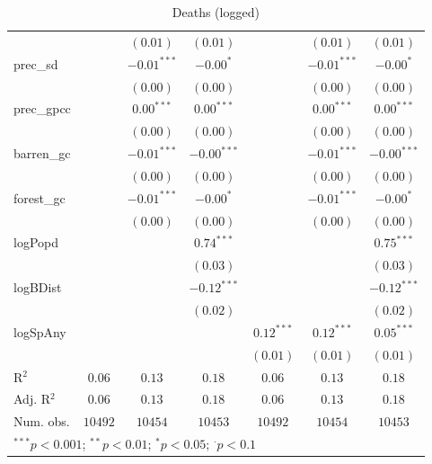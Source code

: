 \begin{sidewaystable}
\begin{center}
{\begin{tabular}{l c c c c c c}
                &               & $(0.01)$        & $(0.01)$      &               & $(0.01)$      & $(0.01)$      \\
prec\_sd        &               & $-0.01^{***}$   & $-0.00^{*}$   &               & $-0.01^{***}$ & $-0.00^{*}$   \\
                &               & $(0.00)$        & $(0.00)$      &               & $(0.00)$      & $(0.00)$      \\
prec\_gpcc      &               & $0.00^{***}$    & $0.00^{***}$  &               & $0.00^{***}$  & $0.00^{***}$  \\
                &               & $(0.00)$        & $(0.00)$      &               & $(0.00)$      & $(0.00)$      \\
barren\_gc      &               & $-0.01^{***}$   & $-0.00^{***}$ &               & $-0.01^{***}$ & $-0.00^{***}$ \\
                &               & $(0.00)$        & $(0.00)$      &               & $(0.00)$      & $(0.00)$      \\
forest\_gc      &               & $-0.01^{***}$   & $-0.00^{*}$   &               & $-0.01^{***}$ & $-0.00^{*}$   \\
                &               & $(0.00)$        & $(0.00)$      &               & $(0.00)$      & $(0.00)$      \\
logPopd         &               &                 & $0.74^{***}$  &               &               & $0.75^{***}$  \\
                &               &                 & $(0.03)$      &               &               & $(0.03)$      \\
logBDist        &               &                 & $-0.12^{***}$ &               &               & $-0.12^{***}$ \\
                &               &                 & $(0.02)$      &               &               & $(0.02)$      \\
logSpAny        &               &                 &               & $0.12^{***}$  & $0.12^{***}$  & $0.05^{***}$  \\
                &               &                 &               & $(0.01)$      & $(0.01)$      & $(0.01)$      \\
\hline
R$^2$           & $0.06$        & $0.13$          & $0.18$        & $0.06$        & $0.13$        & $0.18$        \\
Adj. R$^2$      & $0.06$        & $0.13$          & $0.18$        & $0.06$        & $0.13$        & $0.18$        \\
Num. obs.       & $10492$       & $10454$         & $10453$       & $10492$       & $10454$       & $10453$       \\
\hline
\multicolumn{7}{l}{\scriptsize{$^{***}p<0.001$; $^{**}p<0.01$; $^{*}p<0.05$; $^{\cdot}p<0.1$}}
\end{tabular}
}
\caption{Deaths (logged)}
\label{logDeaths}
\end{center}
\end{sidewaystable}
